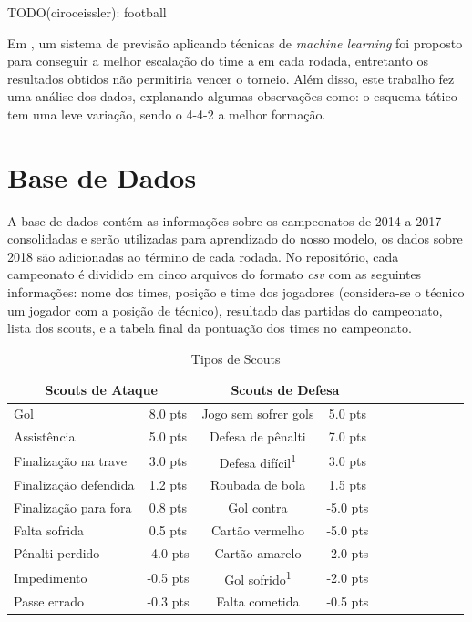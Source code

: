\documentclass[conference]{IEEEtran}
\newcommand{\tit}[1]{{\textit{#1}}}
\newcommand{\ts}{\textsuperscript}
\begin{document}
TODO(ciroceissler): football
\cite{sugar2015predicting}
\cite{porter2018predictive}
\cite{lutz2015fantasy}
\cite{dolan2015machine}
\cite{becker2016analytical}

Em  \cite{viscondiaplicaccao},  um   sistema  de  previsão  aplicando
técnicas  de \tit{machine  learning}  foi proposto  para conseguir  a
melhor escalação do time a  em cada rodada, entretanto os resultados
obtidos não permitiria  vencer o torneio. Além  disso, este trabalho
fez uma análise  dos dados, explanando algumas  observações como: o
esquema  tático tem  uma  leve  variação, sendo  o  4-4-2 a  melhor
formação.

\cite{schmidt2017uso}

\cite{mota2018cartola}

\cite{gomide2018} \cite{git_cartola}

\section{Base de Dados}

A base de  dados \cite{git_cartola} contém as  informações sobre os
campeonatos  de 2014  a  2017 consolidadas  e  serão utilizadas  para
aprendizado do nosso  modelo, os dados sobre 2018  são adicionadas ao
término de cada rodada. No  repositório, cada campeonato é dividido
em cinco arquivos do formato \tit{csv} com as seguintes informações:
nome  dos  times,  posição  e time  dos  jogadores  (considera-se  o
técnico  um  jogador com  a  posição  de técnico),  resultado  das
partidas  do  campeonato,  lista  dos  scouts, e  a  tabela  final  da
pontuação dos times no campeonato.

\begin{table}[h]
\begin{center}
\caption[]{Tipos de Scouts}
\label{tab:model}
\begin{tabular}{| l | c | c | c | c | c | c | c | c | c | c |}
\hline
\multicolumn{2}{|c|}{Scouts de Ataque} & \multicolumn{2}{|c|}{Scouts de Defesa} \\
\hline
Gol                   &  8.0 pts & Jogo sem sofrer gols &  5.0 pts \\
Assistência           &  5.0 pts & Defesa de pênalti    &  7.0 pts \\
Finalização na trave  &  3.0 pts & Defesa difícil\ts{1} &  3.0 pts \\
Finalização defendida &  1.2 pts & Roubada de bola      &  1.5 pts \\
Finalização para fora &  0.8 pts & Gol contra           & -5.0 pts \\
Falta sofrida         &  0.5 pts & Cartão vermelho      & -5.0 pts \\
Pênalti perdido       & -4.0 pts & Cartão amarelo       & -2.0 pts \\
Impedimento           & -0.5 pts & Gol sofrido\ts{1}    & -2.0 pts \\
Passe errado          & -0.3 pts & Falta cometida       & -0.5 pts \\
\hline
\end{tabular}
\end{center}
\end{table}
\end{document}
